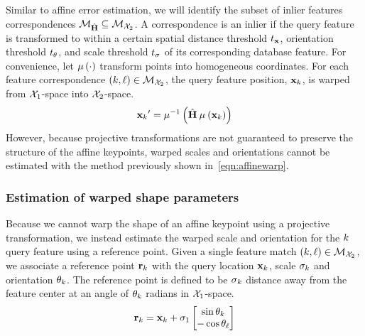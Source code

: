         Similar to affine error estimation, we will identify the subset of inlier features correspondences
        $\mathcal{M}_{\hat{\mathbf{H}}} \subseteq \mathcal{M}_{\mathcal{X}_{2}}$. A correspondence is an inlier if the query feature
        is transformed to within a certain spatial distance threshold $t_{\mathbf{x}}$, orientation threshold
        $t_{{\theta}}$, and scale threshold $t_{{\sigma}}$ of its corresponding database feature. For convenience,
        let $\mathbin{\mu}\left(\cdot\right)$ transform points into homogeneous coordinates. For each feature correspondence $(k,
        \ell) \in \mathcal{M}_{\mathcal{X}_{2}}$, the query feature position, ${\mathbf{x}_{k}}$, is warped from $\mathcal{X}_{1}$-space into
        $\mathcal{X}_{2}$-space.
        \begin{equation}
            {{\ensuremath{\mathbf{x}}_{k}}}' = \mathbin{\mu^{-1}}\left(\hat{\mathbf{H}} \mathbin{\mu}\left({\mathbf{x}_{k}}\right)\right)
        \end{equation}
        However, because projective transformations are not guaranteed
          to preserve the structure of the affine keypoints, warped
          scales and orientations cannot be estimated with the method
          previously shown in~\cref{eqn:affinewarp}.

        \subsubsection{Estimation of warped shape parameters}
        Because we cannot warp the shape of an affine keypoint using a projective transformation, we instead
        estimate the warped scale and orientation for the $k$\th{} query feature using a reference point. Given
        a single feature match $(k, \ell) \in \mathcal{M}_{\mathcal{X}_{2}}$, we associate a reference point ${\mathbf{r}_{k}}$
        with the query location ${\mathbf{x}_{k}}$, scale ${\sigma_{k}}$ and orientation ${\theta_{k}}$. The reference point is defined to
        be ${\sigma_{k}}$ distance away from the feature center at an angle of ${\theta_{k}}$ radians in $\mathcal{X}_{1}$-space.
          \begin{equation}
            {\ensuremath{\mathbf{r}}_{k}} = {\mathbf{x}_{k}} + \sigma_1 \begin{bmatrix} \sin{{\theta_{k}}} \\ -\cos{{\theta_{\ell}}} \end{bmatrix}
          \end{equation}

